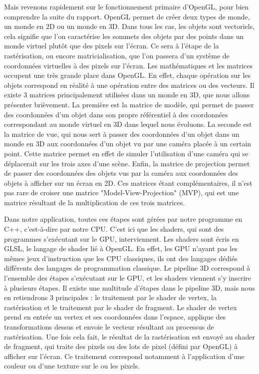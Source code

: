 \documentclass[11pt]{article}
\begin{document}
Mais revenons rapidement sur le fonctionnement primaire d'OpenGL, pour bien
comprendre la suite du rapport. OpenGL permet de créer deux types de monde, un
monde en 2D ou un monde en 3D. Dans tous les cas, les objets sont vectoriels,
cela signifie que l'on caractérise les sommets des objets par des points dans un
monde virtuel plutôt que des pixels sur l'écran. Ce sera à l'étape de la
rastérisation, ou encore matricialisation, que l'on passera d'un système de
coordonnées virtuelles à des pixels sur l'écran. Les mathématiques et les
matrices occupent une très grande place dans OpenGL. En effet, chaque opération
sur les objets correspond en réalité à une opération entre des matrices ou des
vecteurs. Il existe 3 matrices principalement utilisées dans un monde en 3D,
que nous allons présenter brièvement. La première est la matrice de modèle, qui
permet de passer des coordonnées d'un objet dans son propre référentiel à des
coordonnées correspondant au monde virtuel en 3D dans lequel nous évoluons. La
seconde est la matrice de vue, qui nous sert à passer des coordonnées d'un objet
dans un monde en 3D aux coordonnées d'un objet vu par une caméra placée à un
certain point. Cette matrice permet en effet de simuler l'utilisation d'une
caméra qui se déplacerait sur les trois axes d'une scène. Enfin, la matrice de
projection permet de passer des coordonnées des objets vus par la caméra aux
coordonnées des objets à afficher sur un écran en 2D. Ces matrices étant
complémentaires, il n'est pas rare de croiser une matrice
"Model-View-Projection" (MVP), qui est une matrice résultant de la
multiplication de ces trois matrices.

Dans notre application, toutes ces étapes sont gérées par notre programme en
C++, c'est-à-dire par notre CPU. C'est ici que les shaders, qui sont des
programmes s'exécutant sur le GPU, interviennent. Les shaders sont écris en
GLSL, le langage de shader lié à OpenGL. En effet, les GPU n'ayant pas les mêmes
jeux d'instruction que les CPU classiques, ils ont des langages dédiés
différents des langages de programmation classique. Le pipeline 3D correspond à
l'ensemble des étapes s'exécutant sur le GPU, et les shaders viennent s'y
inscrire à plusieurs étapes. Il existe une multitude d'étapes dans le pipeline
3D, mais nous en retiendrons 3 principales : le traitement par le shader de
vertex, la rastérisation et le traitement par le shader de fragment. Le shader
de vertex prend en entrée un vertex et ses coordonnées dans l'espace, applique
des transformations dessus et envoie le vecteur résultant au processus de
rastérisation. Une fois cela fait, le résultat de la rastérisation est envoyé au
shader de fragment, qui traite des pixels ou des lots de pixel (défini par
OpenGL) à afficher sur l'écran. Ce traitement correspond notamment à
l'application d'une couleur ou d'une texture sur le ou les pixels.
\end{document}
